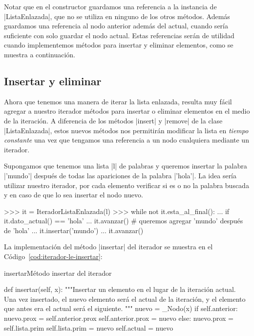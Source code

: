 Notar que en el constructor guardamos una referencia a la instancia de
|ListaEnlazada|, que no se utiliza en ninguno de los otros métodos. Además
guardamos una referencia al nodo anterior además del actual, cuando sería
suficiente con solo guardar el nodo actual.  Estas referencias serán de
utilidad cuando implementemos métodos para insertar y eliminar elementos,
como se muestra a continuación.

\subsection{Insertar y eliminar}

Ahora que tenemos una manera de iterar la lista enlazada, resulta muy fácil
agregar a nuestro iterador métodos para insertar o eliminar elementos en el
medio de la iteración. A diferencia de los métodos |insert| y |remove| de la
clase |ListaEnlazada|, estos nuevos métodos nos permitirán modificar la lista
en \emph{tiempo constante} una vez que tengamos una referencia a un nodo
cualquiera mediante un iterador.

Supongamos que tenemos una lista |l| de palabras y queremos insertar la palabra
|'mundo'| después de todas las apariciones de la palabra |'hola'|. La idea
sería utilizar nuestro iterador, por cada elemento verificar si es o no la
palabra buscada y en caso de que lo sea insertar el nodo nuevo.

\begin{codigo-python-sn}
>>> it = IteradorListaEnlazada(l)
>>> while not it.esta_al_final():
...     if it.dato_actual() == 'hola'
...         it.avanzar() # queremos agregar 'mundo' después de 'hola'
...         it.insertar('mundo')
...     it.avanzar()
\end{codigo-python-sn}

La implementación del método |insertar| del iterador se muestra en el
Código~\ref{cod:iterador-le-insertar}:

\begin{codigo}{insertar}{Método insertar del iterador}
\label{cod:iterador-le-insertar}
\begin{codigo-python}
    def insertar(self, x):
        """Insertar un elemento en el lugar de la iteración actual.
        Una vez insertado, el nuevo elemento será el actual de la iteración,
        y el elemento que antes era el actual será el siguiente.
        """
        nuevo = _Nodo(x)
        if self.anterior:
            nuevo.prox = self.anterior.prox
            self.anterior.prox = nuevo
        else:
            nuevo.prox = self.lista.prim
            self.lista.prim = nuevo
        self.actual = nuevo
\end{codigo-python}
\end{codigo}

